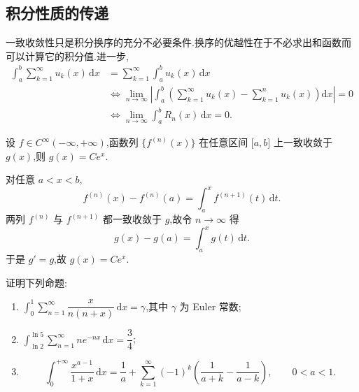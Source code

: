 \subsection{积分性质的传递}

一致收敛性只是积分换序的充分不必要条件.换序的优越性在于不必求出和函数而可以计算它的积分值.进一步,
\[
    \begin{aligned}
        \int_a^b\sum\limits_{k=1}^{\infty}u_k(x)\,\mathrm{d}x
         & =\sum\limits_{k=1}^{\infty}\int_a^b u_k(x)\,\mathrm{d}x                                                                                  \\
         & \iff \lim\limits_{n\to\infty}\left|\int_a^b\left(\sum\limits_{k=1}^{\infty}u_k(x)-\sum\limits_{k=1}^{n}u_k(x)\right)\mathrm{d}x\right|=0 \\
         & \iff \lim\limits_{n\to\infty}\int_a^bR_n(x)\,\mathrm{d}x=0.
    \end{aligned}
\]

\begin{example}
    设 $f\in C^{\infty}(-\infty,+\infty)$,函数列 $\{f^{(n)}(x)\}$ 在任意区间 $\lbrack a,b\rbrack$ 上一致收敛于 $g(x)$,则 $g(x)=Ce^x$.
\end{example}
\exampleblank

\begin{solution}
    对任意 $a<x<b$,
    \[
        f^{(n)}(x)-f^{(n)}(a)=\int_a^xf^{(n+1)}(t)\,\mathrm{d}t.
    \]
    两列 $f^{(n)}$ 与 $f^{(n+1)}$ 都一致收敛于 $g$,故令 $n\to\infty$ 得
    \[
        g(x)-g(a)=\int_a^xg(t)\,\mathrm{d}t.
    \]
    于是 $g'=g$,故 $g(x)=Ce^x$.
\end{solution}

\begin{example}
    证明下列命题:
    \begin{enumerate}
        \item $\displaystyle\int_0^1\sum\limits_{n=1}^{\infty}\dfrac{x}{n(n+x)}\,\mathrm{d}x=\gamma$,其中 $\gamma$ 为 Euler 常数;
        \item $\displaystyle\int_{\ln2}^{\ln5}\sum\limits_{n=1}^{\infty}ne^{-nx}\,\mathrm{d}x=\dfrac{3}{4}$;
        \item
              \[
                  \displaystyle\int_0^{+\infty}\dfrac{x^{a-1}}{1+x}\,\mathrm{d}x
                  =\dfrac{1}{a}+\sum\limits_{k=1}^{\infty}(-1)^k
                  \left(\dfrac{1}{a+k}-\dfrac{1}{a-k}\right),
                  \qquad 0<a<1.
              \]
    \end{enumerate}
\end{example}
\exampleblank


